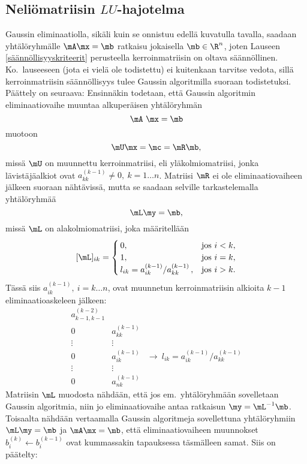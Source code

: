 \subsection{Neliömatriisin $LU$-hajotelma}

Gaussin eliminaatiolla, sikäli kuin se onnistuu edellä kuvatulla tavalla, saadaan yhtälöryhmälle
$\mA\mx=\mb$ ratkaisu jokaisella $\mb\in\R^n$, joten Lauseen \ref{säännöllisyyskriteerit}
perusteella kerroinmatriisin on oltava säännöllinen. Ko.\ lauseeseen (jota ei vielä ole 
todistettu) ei kuitenkaan tarvitse vedota, sillä kerroinmatriisin säännöllisyys tulee Gaussin
algoritmilla suoraan todistetuksi. Päättely on seuraava: Ensinnäkin todetaan, että Gaussin
algoritmin eliminaatiovaihe muuntaa alkuperäisen yhtälöryhmän
\[
\mA \mx = \mb
\]
muotoon
\[
\mU \mx = \mc = \mR \mb,
\]
missä $\mU$ on muunnettu kerroinmatriisi, eli yläkolmiomatriisi, jonka lävistäjäalkiot ovat 
$a_{kk}^{(k-1)} \neq 0, \ k=1 \ldots n$. Matriisi $\mR$ ei ole eliminaatiovaiheen jälkeen 
suoraan nähtävissä, mutta se saadaan selville tarkastelemalla yhtälöryhmää
\[
\mL \my = \mb,
\]
missä $\mL$ on alakolmiomatriisi, joka määritellään
\[
[\mL]_{ik} = \begin{cases}
\,0, &\text{jos}\ i<k, \\
\,1, &\text{jos}\ i=k, \\
\,l_{ik}=a_{ik}^{(k-1)}/a_{kk}^{(k-1)}\,, &\text{jos}\ i>k.
\end{cases}
\]
Tässä siis $a_{ik}^{(k-1)}, \ i=k \ldots n$, ovat muunnetun kerroinmatriisin alkioita $k-1$ 
eliminaatioaskeleen jälkeen:
\[
\begin{array}{ccc}
a_{k-1,k-1}^{(k-2)} \\
0 & a_{kk}^{(k-1)} \\
\vdots & \vdots \\
0 & a_{ik}^{(k-1)} & \rightarrow\ l_{ik} = a_{ik}^{(k-1)}/a_{kk}^{(k-1)} \\
\vdots & \vdots \\
0 & a_{nk}^{(k-1)}
\end{array}
\]
Matriisin $\mL$ muodosta nähdään, että jos em.\ yhtälöryhmään sovelletaan Gaussin algoritmia, 
niin jo eliminaatiovaihe antaa ratkaisun $\my=\mL^{-1}\mb$. Toisaalta nähdään vertaamalla 
Gaussin algoritmeja sovellettuna yhtälöryhmiin $\mL\my=\mb$ ja $\mA\mx=\mb$, että 
eliminaatiovaiheen muunnokset $b_i^{(k)} \leftarrow b_i^{(k-1)}$ ovat kummassakin tapauksessa 
täsmälleen samat. Siis on päätelty:
